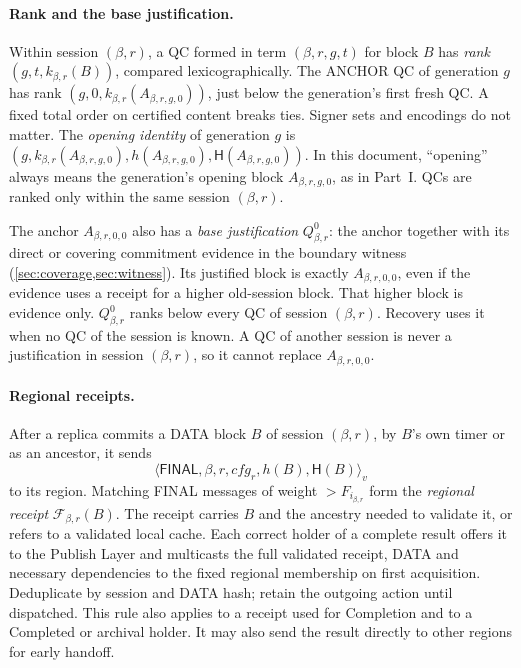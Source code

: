 \documentclass[11pt,a4paper]{article}
\newcommand{\FC}{\mathcal F}
\newcommand{\Hash}{\mathsf H}
\newcommand{\tagg}[1]{\ensuremath{\mathsf{#1}}}
\newcommand{\defterm}[1]{\textcolor{rrBlue}{\textit{#1}}}
\begin{document}
\paragraph{Rank and the base justification.}
Within session $(\beta,r)$, a QC formed in term $(\beta,r,g,t)$ for block $B$ has \defterm{rank}
$(g,t,k_{\beta,r}(B))$, compared lexicographically. The ANCHOR QC of generation
$g$ has rank $(g,0,k_{\beta,r}(A_{\beta,r,g,0}))$, just below the generation's first
fresh QC. A fixed total order on certified content breaks ties. Signer
sets and encodings do not matter. The \defterm{opening
identity} of generation $g$ is
$(g,k_{\beta,r}(A_{\beta,r,g,0}),h(A_{\beta,r,g,0}),\Hash(A_{\beta,r,g,0}))$. In this document,
``opening'' always means the generation's opening block $A_{\beta,r,g,0}$, as
in Part~I. QCs are ranked only within the same session $(\beta,r)$.

The anchor $A_{\beta,r,0,0}$ also has a \defterm{base justification} $Q_{\beta,r}^0$: the
anchor together with its direct or covering commitment evidence in the
boundary witness (\cref{sec:coverage,sec:witness}). Its justified block
is exactly $A_{\beta,r,0,0}$, even if the evidence uses a receipt for a higher
old-session block. That higher block is evidence only. $Q_{\beta,r}^0$ ranks
below every QC of session $(\beta,r)$.
Recovery uses it when no QC of the session is known. A QC of another
session is never a justification in session $(\beta,r)$, so it cannot replace
$A_{\beta,r,0,0}$.

\paragraph{Regional receipts.}
After a replica commits a DATA block $B$ of session $(\beta,r)$, by $B$'s own
timer or as an ancestor, it sends
\[
 \langle\tagg{FINAL},\beta,r,\mathit{cfg}_r,h(B),\Hash(B)\rangle_v
\]
to its region. Matching FINAL messages of weight
$>F_{i_{\beta,r}}$ form the \defterm{regional receipt} $\FC_{\beta,r}(B)$. The receipt carries $B$ and the ancestry needed to validate it, or
refers to a validated local cache. Each correct holder of a complete
result offers it to the Publish Layer and multicasts the full validated
receipt, DATA and necessary dependencies to the fixed regional membership
on first acquisition. Deduplicate by session and DATA hash; retain the
outgoing action until dispatched. This rule also applies to a receipt
used for Completion and to a Completed or archival holder. It may also
send the result directly to other regions for early handoff.
\end{document}
